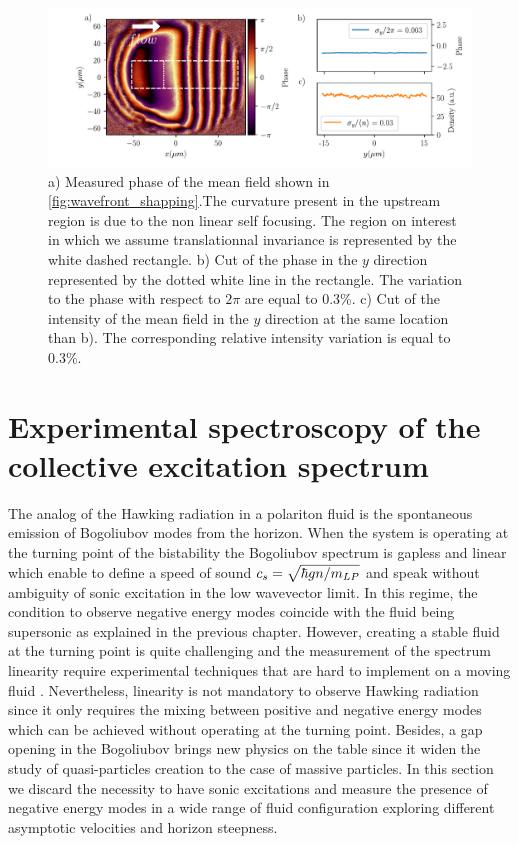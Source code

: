 \begin{figure}[h]
    \centering
    \includegraphics[width=1\textwidth]{chap_custom_st/fig/phase_example.pdf}
    \caption{a) Measured phase of the mean field shown in \autoref{fig:wavefront_shapping}.The curvature present in the upstream region is due to the non linear self focusing. The region
    on interest in which we assume translationnal invariance is represented by the white dashed rectangle. b)  Cut of the phase in the $y$ direction represented by the dotted white line in the rectangle. The variation to the phase with respect
    to $2\pi$ are equal to 0.3\%. c) Cut of the intensity of the mean field in the $y$ direction at the same location than b). The corresponding relative intensity variation is equal to 0.3\%.}
    \label{fig:phase_example}
\end{figure}

\section{Experimental spectroscopy of the collective excitation spectrum}

The analog of the Hawking radiation in a polariton fluid is the spontaneous emission of Bogoliubov modes from the horizon. When the system is operating at the turning point of the bistability the Bogoliubov spectrum 
is gapless and linear which enable to define a speed of sound $c_s = \sqrt{\hbar g n /m_{LP}}$ and speak without ambiguity of sonic excitation in the low wavevector limit. In this regime, the condition to observe negative energy modes coincide with the fluid being supersonic as explained in the previous chapter. 
However, creating a stable fluid at the turning point is quite challenging and the measurement of the spectrum linearity require experimental techniques that are hard to implement on a moving fluid \cite{claude_phd}. Nevertheless, linearity is not mandatory to observe Hawking radiation since 
it only requires the mixing between positive and negative energy modes which can be achieved without operating at the turning point. Besides, a gap opening in the Bogoliubov brings new physics on the table since it widen the study of quasi-particles creation to the case of massive particles. In this
section we discard the necessity to have sonic excitations and measure the presence of negative energy modes in a wide range of fluid configuration exploring different asymptotic velocities and horizon steepness.

